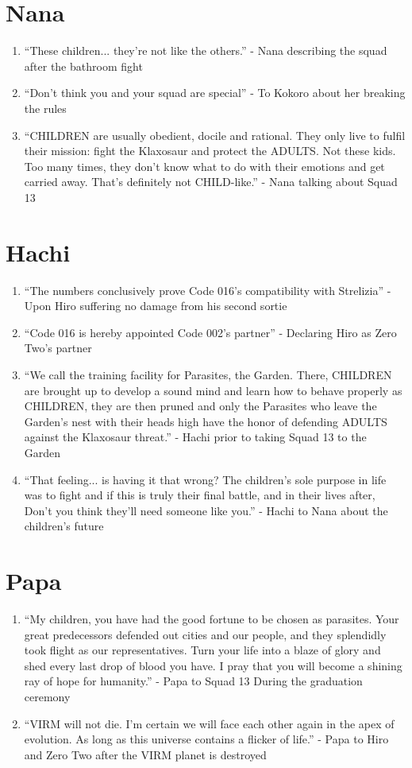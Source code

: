 \documentclass{book}
\numberwithin{equation}{section}
\begin{document}
\section{Nana}
\begin{enumerate}
    \item ``These children... they're not like the others.'' - Nana describing the squad after the bathroom fight
    \item ``Don't think you and your squad are special'' - To Kokoro about her breaking the rules
    \item ``CHILDREN are usually obedient, docile and rational. They only live to fulfil their mission: fight the Klaxosaur and protect the ADULTS. Not these kids. Too many times, they don't know what to do with their emotions and get carried away. That's definitely not CHILD-like.'' - Nana talking about Squad 13 
\end{enumerate}

\section{Hachi}
\begin{enumerate}
    \item ``The numbers conclusively prove Code 016's compatibility with Strelizia'' - Upon Hiro suffering no damage from his second sortie
    \item ``Code 016 is hereby appointed Code 002's partner'' - Declaring Hiro as Zero Two's partner
    \item ``We call the training facility for Parasites, the Garden. There, CHILDREN are brought up to develop a sound mind and learn how to behave properly as CHILDREN, they are then pruned and only the Parasites who leave the Garden's nest with their heads high have the honor of defending ADULTS against the Klaxosaur threat.'' - Hachi prior to taking Squad 13 to the Garden
    \item ``That feeling... is having it that wrong? The children's sole purpose in life was to fight and if this is truly their final battle, and in their lives after, Don't you think they'll need someone like you.'' - Hachi to Nana about the children's future
\end{enumerate}

\section{Papa}
\begin{enumerate}
    \item ``My children, you have had the good fortune to be chosen as parasites. Your great predecessors defended out cities and our people, and they splendidly took flight as our representatives. Turn your life into a blaze of glory and shed every last drop of blood you have. I pray that you will become a shining ray of hope for humanity.'' - Papa to Squad 13 During the graduation ceremony
    \item ``VIRM will not die. I'm certain we will face each other again in the apex of evolution. As long as this universe contains a flicker of life.'' - Papa to Hiro and Zero Two after the VIRM planet is destroyed
\end{enumerate}
\end{document}
